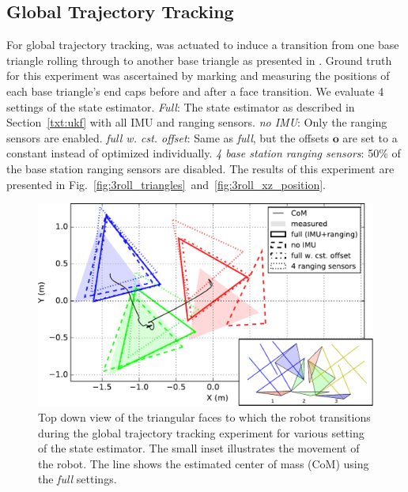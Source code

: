 {\subsection{Global Trajectory Tracking}
For global trajectory tracking, \SB{} was actuated to induce a transition from one base triangle rolling through to another base triangle as presented in \cite{sabelhaus2015system}.
Ground truth for this experiment was ascertained by marking and measuring the positions of each base triangle's end caps before and after a face transition.
We evaluate 4 settings of the state estimator. \emph{Full}: The state estimator as described in Section~\ref{txt:ukf} with all IMU and ranging sensors. \emph{no IMU}: Only the ranging sensors are enabled. \emph{full w. cst. offset}: Same as \emph{full}, but the offsets $\bm{o}$ are set to a constant instead of optimized individually. \emph{4 base station ranging sensors}: 50\% of the base station ranging sensors are disabled. 
The results of this experiment are presented in Fig.~\ref{fig:3roll_triangles}~and~\ref{fig:3roll_xz_position}.
\begin{figure}[tpbh]
 \centering
  \includegraphics[width=\linewidth]{tex/img/top_view.pdf}
\caption{Top down view of the triangular faces to which the robot transitions during the global trajectory tracking experiment for various setting of the state estimator. The small inset illustrates the movement of the robot. The line shows the estimated center of mass (CoM) using the \emph{full} settings.
}
\end{figure}}
